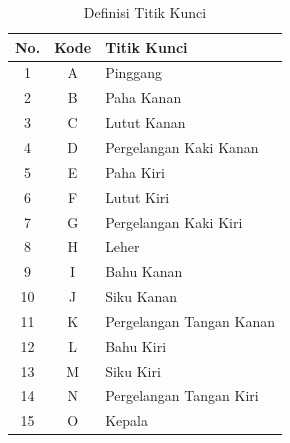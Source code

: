 \begin{table}[htbp]
    \captionsetup{labelfont=bf, textfont=bf}
    \caption{Definisi Titik Kunci}
    \label{tab:definisititikkunci}
    \vspace{-20pt}
    \begin{center}
        \begin{tabular}{|c|c|l|}
            \hline
            \textbf{No.} & \textbf{Kode} & \hspace{2cm}\textbf{Titik Kunci} \\ \hline
            1            & A             & Pinggang                         \\ \hline
            2            & B             & Paha Kanan                       \\ \hline
            3            & C             & Lutut Kanan                      \\ \hline
            4            & D             & Pergelangan Kaki Kanan           \\ \hline
            5            & E             & Paha Kiri                        \\ \hline
            6            & F             & Lutut Kiri                       \\ \hline
            7            & G             & Pergelangan Kaki Kiri            \\ \hline
            8            & H             & Leher                            \\ \hline
            9            & I             & Bahu Kanan                       \\ \hline
            10           & J             & Siku Kanan                       \\ \hline
            11           & K             & Pergelangan Tangan Kanan         \\ \hline
            12           & L             & Bahu Kiri                        \\ \hline
            13           & M             & Siku Kiri                        \\ \hline
            14           & N             & Pergelangan Tangan Kiri          \\ \hline
            15           & O             & Kepala                           \\ \hline
        \end{tabular}
    \end{center}
    \vspace{-10pt}
\end{table}

